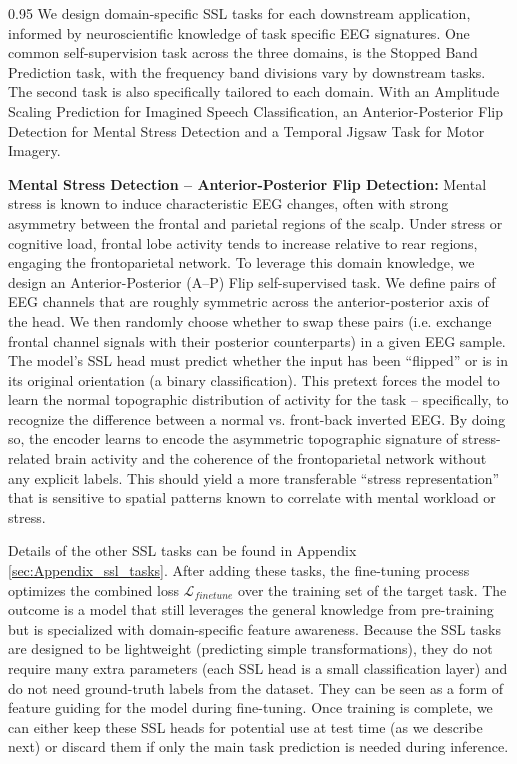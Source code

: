 \documentclass{article} %
\begin{document}
\begin{spacing}{0.95}
We design domain-specific SSL tasks for each downstream application, informed by neuroscientific knowledge of task specific EEG signatures. One common self-supervision task across the three domains, is the Stopped Band Prediction task, with the frequency band divisions vary by downstream tasks. The second task is also specifically tailored to each domain. With an Amplitude Scaling Prediction for Imagined Speech Classification, an Anterior-Posterior Flip Detection for Mental Stress Detection and a Temporal Jigsaw Task for Motor Imagery. 


\textbf{Mental Stress Detection – Anterior-Posterior Flip Detection:} Mental stress is known to induce characteristic EEG changes, often with strong asymmetry between the frontal and parietal regions of the scalp. Under stress or cognitive load, frontal lobe activity tends to increase relative to rear regions, engaging the frontoparietal network. To leverage this domain knowledge, we design an Anterior-Posterior (A–P) Flip self-supervised task. We define pairs of EEG channels that are roughly symmetric across the anterior-posterior axis of the head. We then randomly choose whether to swap these pairs (i.e. exchange frontal channel signals with their posterior counterparts) in a given EEG sample. The model’s SSL head must predict whether the input has been “flipped” or is in its original orientation (a binary classification). This pretext forces the model to learn the normal topographic distribution of activity for the task – specifically, to recognize the difference between a normal vs. front-back inverted EEG. By doing so, the encoder learns to encode the asymmetric topographic signature of stress-related brain activity and the coherence of the frontoparietal network without any explicit labels. This should yield a more transferable “stress representation” that is sensitive to spatial patterns known to correlate with mental workload or stress.

Details of the other SSL tasks can be found in Appendix \ref{sec:Appendix_ssl_tasks}. After adding these tasks, the fine-tuning process optimizes the combined loss $\mathcal{L}_{finetune}$ over the training set of the target task. The outcome is a model that still leverages the general knowledge from pre-training but is specialized with domain-specific feature awareness. Because the SSL tasks are designed to be lightweight (predicting simple transformations), they do not require many extra parameters (each SSL head is a small classification layer) and do not need ground-truth labels from the dataset. They can be seen as a form of feature guiding for the model during fine-tuning. Once training is complete, we can either keep these SSL heads for potential use at test time (as we describe next) or discard them if only the main task prediction is needed during inference.

\end{spacing}
\end{document}
